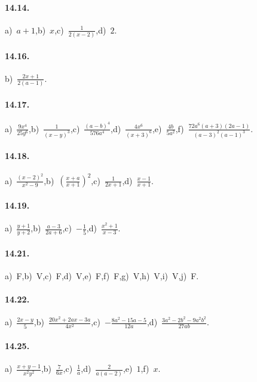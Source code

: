 \paragraph{14.14.}
a)~$a+1$,\quad b)~$x$,\quad c)~$\frac{1}{2(x-2)}$,\quad d)~$2$.

\paragraph{14.16.}
b)~$\frac{2x+1}{2(a-1)}$.

\paragraph{14.17.}
a)~$\frac{9x^{4}}{25y^{6}}$,\quad b)~$\frac{1}{(x-y)^{3}}$,\quad c)~$\frac{(a-b)^{4}}{576a^{4}}$,\quad d)~$\frac{4x^{6}}{(x+3)^{6}}$,\quad e)~$\frac{4b}{5a^{2}}$,\quad f)~$\frac{72a^{6}(a+3)(2a-1)}{(a-3)^{2}(a-1)^{3}}$.

\paragraph{14.18.}
a)~$\frac{(x-2)^{2}}{x^{2}-9}$,\quad b)~$\left(\frac{x+a}{x+1}\right)^{2}$,\quad c)~$\frac{1}{2x+1}$,\quad d)~$\frac{x-1}{x+1}$.

\paragraph{14.19.}
a)~$\frac{y+1}{y+2}$,\quad b)~$\frac{a-3}{2a+6}$,\quad c)~$-{\frac{1}{5}}$,\quad d)~$\frac{x^{2}+1}{x-3}$.

\paragraph{14.21.}
a)~F,\quad b)~V,\quad c)~F,\quad d)~V,\quad e)~F,\quad f)~F,\quad g)~V,\quad h)~V,\quad i)~V,\quad j)~F.

\paragraph{14.22.}
a)~$\frac{2x-y}{5}$,\quad b)~$\frac{20x^{2}+2ax-3a}{4x^{2}}$,\quad c)~$-{\frac{8a^{2}-15a-5}{12a}}$,\quad d)~$\frac{3a^{2}-2b^{2}-9a^{2}b^{2}}{27ab}$.

\paragraph{14.25.}
a)~$\frac{x+y-1}{x^{2}y^{2}}$,\quad b)~$\frac{7}{6x}$,\quad c)~$\frac{1}{a}$,\quad d)~$\frac{2}{a(a-2)}$,\quad e)~$1$,\quad f)~$x$.

